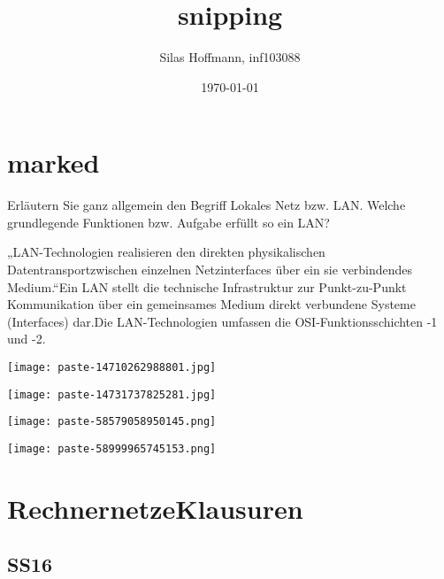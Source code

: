 \documentclass{article}
\title{snipping}
\author{Silas Hoffmann, inf103088}
\date{\today}
\begin{document}
\maketitle
\vspace{0.5cm}
\tableofcontents
\clearpage

\section{marked}
\begin{tcolorbox}[colback=white!10!white,colframe=lightgray!75!black,
  savelowerto=\jobname_ex.tex,breakable,enhanced,lines before break=40]

\justifying
Erläutern Sie ganz allgemein den Begriff Lokales Netz bzw. LAN. Welche grundlegende Funktionen bzw. Aufgabe erfüllt so ein LAN?

\tcblower

\justifying
„LAN-Technologien realisieren den direkten physikalischen Datentransportzwischen einzelnen Netzinterfaces über ein sie verbindendes Medium.“Ein LAN stellt die technische Infrastruktur zur Punkt-zu-Punkt Kommunikation über ein gemeinsames Medium direkt verbundene Systeme (Interfaces) dar.Die LAN-Technologien umfassen die OSI-Funktionsschichten -1 und -2.\begin{center}
\texttt{[image: paste-14710262988801.jpg]}
\end{center}
\begin{center}
\texttt{[image: paste-14731737825281.jpg]}
\end{center}
\begin{center}
\texttt{[image: paste-58579058950145.png]}
\end{center}
\begin{center}
\texttt{[image: paste-58999965745153.png]}
\end{center}

\end{tcolorbox}
\section{RechnernetzeKlausuren}
\subsection{SS16}
\end{document}
